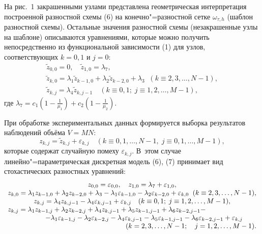 На рис.~1 закрашенными узлами представлена геометрическая интерпретация построенной разностной схемы (6) на конечно"=разностной сетке $\omega_{\tau,h}$ (шаблон разностной схемы). 
Остальные значения разностной схемы (незакрашенные узлы на шаблоне) описываются уравнениями, 
которые можно получить непосредственно из функциональной зависимости (1) для узлов, соответствующих $k=0, 1$ и $j=0$:
\begin{equation}
\begin{array}{c}
\tilde{z}_{0,0}=0,\quad \tilde{z}_{1,0}=\lambda_7,\\
\tilde{z}_{k,0}=\lambda_1\tilde{z}_{k-1,0}+\lambda_2\tilde{z}_{k-2,0}+\lambda_3 \;\;(k\equiv 2, 3, \ldots, N-1),\\
\tilde{z}_{k,j}=\lambda_4\tilde{z}_{k,j-1} \quad  (k\equiv 0, 1; \; j\equiv1, 2, \ldots, M-1),
\end{array}
\end{equation}
где $\lambda_7=c_1(1-\frac{1}{\mu_1})+c_2(1-\frac{1}{\mu_2})$.



При обработке экспериментальных данных формируется выборка результатов наблюдений объёма $V=MN$: $$z_{k,j}=\tilde{z}_{k,j}+\varepsilon_{k,j}
\quad (k\equiv 0, 1, \ldots, N-1,\; j\equiv 0,1, \ldots, M-1),
$$ которые содержат случайную помеху $\varepsilon_{k,j}$. 
В~этом случае линейно"=параметрическая дискретная модель (6), (7) принимает вид стохастических разностных уравнений:
\begin{equation*}
\begin{array}{c}
z_{0,0}= \varepsilon_{0,0},\quad  z_{1,0}=\lambda_7+\varepsilon_{1,0},\\
z_{k,0}= \lambda_1z_{k-1,0}+\lambda_2z_{k-2,0}+\lambda_3 -\lambda_1\varepsilon_{k-1,0}-\lambda_2\varepsilon_{k-2,0}+\varepsilon_{k,0} \; \; (k\equiv 2, 3, \ldots, N-1),\\
z_{k,j}=\lambda_4z_{k,j-1}-\lambda_4\varepsilon_{k,j-1}+\varepsilon_{k,j} \quad ( k\equiv0, 1; \; j\equiv1, 2, \ldots, M-1),\\
z_{k,j}= \lambda_1z_{k-1,j}+\lambda_2z_{k-2,j}+\lambda_4z_{k,j-1} +\lambda_5z_{k-1,j-1}+\lambda_6z_{k-2,j-1} - \hfill \\ \hfill -\lambda_1\varepsilon_{k-1,j}-\lambda_2\varepsilon_{k-2,j}-\lambda_4\varepsilon_{k,j-1}
-\lambda_5\varepsilon_{k-1,j-1}-\lambda_6\varepsilon_{k-2,j-1}+\varepsilon_{k,j} \qquad  {}\\  \hfill (k=2, 3, \ldots, N-1; \quad j=1, 2, \ldots, M-1).
\end{array}
\end{equation*}

